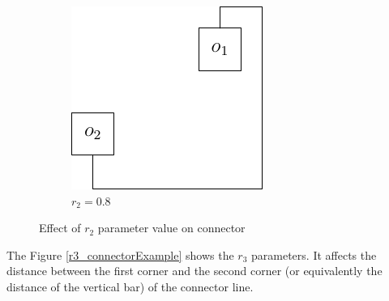 \documentclass[a4paper,12pt]{report}
\begin{document}
\begin{figure}
\begin{subfigure}{.33\textwidth}
  \end{subfigure}\hfill
  \begin{subfigure}{.33\textwidth}
    \centering
    \includegraphics[width=0.9\linewidth]{connectorExample_r2_0_8.pdf}
    \caption{$r_2=0.8$}
  \end{subfigure}

  \caption{Effect of $r_2$ parameter value on connector}
  \label{r2_connectorExample}
\end{figure}

The Figure \ref{r3_connectorExample} shows the $r_3$ parameters. It affects the distance between the first corner and the
second corner (or equivalently the distance of the vertical bar) of the connector line.
\end{document}
